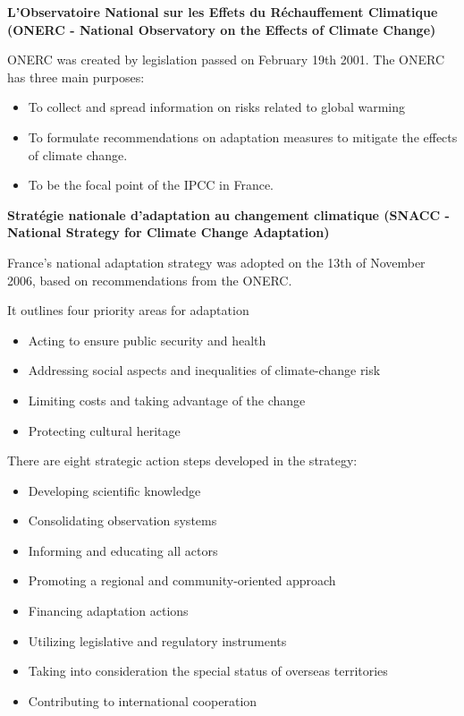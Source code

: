 \textbf{L’Observatoire National sur les Effets du Réchauffement Climatique (ONERC - National Observatory on the Effects of Climate Change)}



ONERC was created by legislation passed on February 19th 2001. The ONERC has three main purposes:
\begin{itemize}
	\item To collect and spread information on risks related to global warming
	\item To formulate recommendations on adaptation measures to mitigate the effects of climate change.
	\item To be the focal point of the IPCC in France.
\end{itemize}



\textbf{Stratégie nationale d’adaptation au changement climatique (SNACC - National Strategy for Climate Change Adaptation)}



France's national adaptation strategy was adopted on the 13th of November 2006, based on recommendations from the ONERC. 



It outlines four priority areas for adaptation
\begin{itemize}
	\item Acting to ensure public security and health
	\item Addressing social aspects and inequalities of climate-change risk
	\item Limiting costs and taking advantage of the change
	\item Protecting cultural heritage
\end{itemize}



There are eight strategic action steps developed in the strategy:
\begin{itemize}
	\item Developing scientific knowledge
	\item Consolidating observation systems
	\item Informing and educating all actors
	\item Promoting a regional and community-oriented approach
	\item Financing adaptation actions
	\item Utilizing legislative and regulatory instruments
	\item Taking into consideration the special status of overseas territories
	\item Contributing to international cooperation
\end{itemize}



